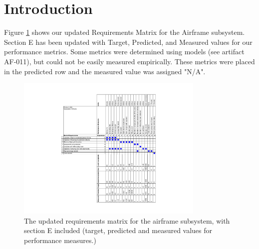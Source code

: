 \documentclass[]{auvsi_doc}
\begin{document}
\begin{AUVSITitlePage}
\begin{artifacttable}
\end{artifacttable}
\end{AUVSITitlePage}

\section{Introduction}
Figure \ref{fig:reqmatrix} shows our updated Requirements Matrix for the Airframe subsystem. Section E has been updated with Target, Predicted, and Measured values for our performance metrics. Some metrics were determined using models (see artifact AF-011), but could not be easily measured empirically. These metrics were placed in the predicted row and the measured value was assigned "N/A".


\begin{figure}[h!]
	\centering
	\includegraphics[width=0.8\textwidth]{reqmatrix.pdf}
	\caption{The updated requirements matrix for the airframe subsystem, with section E included (target, predicted and measured values for performance measures.)}
	\label{fig:reqmatrix}
\end{figure}
\end{document}
